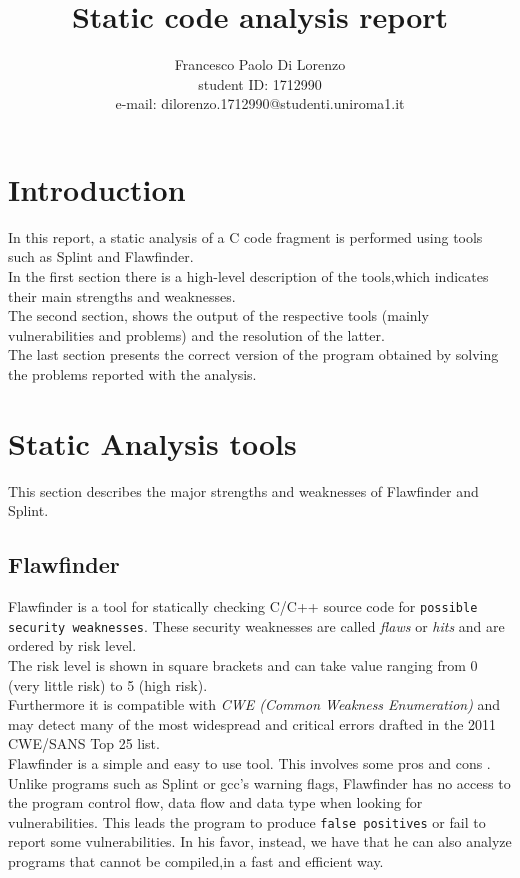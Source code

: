 \documentclass[a4paper,12pt]{article}
\begin{document}
%

   \title{Static code analysis report}

   \author{Francesco Paolo Di Lorenzo  \\ student ID: 1712990 \\ e-mail: dilorenzo.1712990@studenti.uniroma1.it}
          
   \date{}

   \maketitle
   

 
\tableofcontents
 


\section*{Introduction}
In this report, a static analysis of a C code fragment is performed using tools such as Splint and Flawfinder. \\
In the first section there is a high-level description of the tools,which indicates their main strengths and weaknesses. \\
The second section, shows the output of the respective tools (mainly vulnerabilities and problems) and the resolution of the latter.\\
The last section presents the correct version of the program obtained by solving the problems reported with the analysis.


\section{Static Analysis tools}
This section describes the major strengths and weaknesses of Flawfinder and Splint.
\subsection{Flawfinder}
Flawfinder is a tool for statically checking C/C++ source code for \texttt{possible security weaknesses}. These security weaknesses are called \textit{flaws} or \textit{hits} and are ordered by risk level.\\
The risk level is shown in square brackets and can take value ranging from 0 (very little risk) to 5 (high risk)\cite{flaw}.\\
Furthermore it is compatible with \textit{CWE (Common
Weakness Enumeration)} \cite{flaw2}\cite{CWE} and may detect many of the most widespread and
critical errors drafted in the 2011 CWE/SANS Top 25 list.\\
Flawfinder is a simple and easy to use tool. This involves some pros and cons \cite{flaw}.\\
Unlike programs such as Splint or gcc's warning flags, Flawfinder has no access to the program control flow, data flow and data type when looking for vulnerabilities.
This leads the program to produce \texttt{false positives} or fail to report some vulnerabilities.
In his favor, instead, we have that he can also analyze programs that cannot be compiled,in a fast and efficient way.
\end{document}
